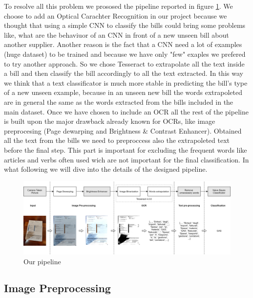 \documentclass[10pt,twocolumn,letterpaper]{article}
\begin{document}
To resolve all this problem we prososed the pipeline reported in
figure \ref{fig:pipeline}. We choose to add an Optical Carachter
Recognition in our project because we thought that using a simple CNN
to classify the bills could bring some problems like, what are the
behaviuor of an CNN in front of a new unseen bill about another
supplier. Another reason is the fact that a CNN need a lot of examples
(huge dataset) to be trained and because we have only "few" exaples we
prefered to try another approach. So we chose Tesseract to extrapolate
all the text inside a bill and then classify the bill accordingly to
all the text extracted. In this way we think that a text classificator
is much more stable in predicting the bill's type of a new unseen
example, because in an unseen new bill the words extrapoleted are in
general the same as the words extracted from the bills included in the
main dataset. Once we have chosen to include an OCR all the rest of
the pipeline is built upon the major drawback already known for OCRs,
like image preprocesing (Page dewarping and Brightness \& Contrast
Enhancer). Obtained all the text from the bills we need to preproccess
also the extrapoleted text before the final step. This part is
important for excluding the frequent words like articles and verbs
often used wich are not important for the final classification. In
what following we will dive into the details of the designed pipeline.

\begin{figure}[h]
  \centering
  \includegraphics[width=1.0\textwidth]{images/pipeline.png}
  \caption{Our pipeline}
  \label{fig:pipeline}
\end{figure}

\subsection{Image Preprocessing}
\end{document}
